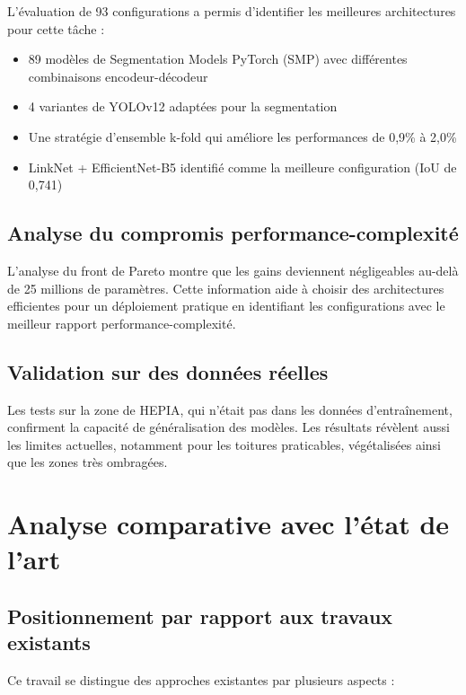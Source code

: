 L'évaluation de 93 configurations a permis d'identifier les meilleures architectures pour cette tâche :

\begin{itemize}
    \item 89 modèles de Segmentation Models PyTorch (SMP) avec différentes combinaisons encodeur-décodeur
    \item 4 variantes de YOLOv12 adaptées pour la segmentation
    \item Une stratégie d'ensemble k-fold qui améliore les performances de 0,9\% à 2,0\%
    \item LinkNet + EfficientNet-B5 identifié comme la meilleure configuration (IoU de 0,741)
\end{itemize}

\subsection{Analyse du compromis performance-complexité}

L'analyse du front de Pareto montre que les gains deviennent négligeables au-delà de 25 millions de paramètres. Cette information aide à choisir des architectures efficientes pour un déploiement pratique en identifiant les configurations avec le meilleur rapport performance-complexité.

\subsection{Validation sur des données réelles}

Les tests sur la zone de HEPIA, qui n'était pas dans les données d'entraînement, confirment la capacité de généralisation des modèles. Les résultats révèlent aussi les limites actuelles, notamment pour les toitures praticables, végétalisées ainsi que les zones très ombragées.

\section{Analyse comparative avec l'état de l'art}

\subsection{Positionnement par rapport aux travaux existants}

Ce travail se distingue des approches existantes par plusieurs aspects :

